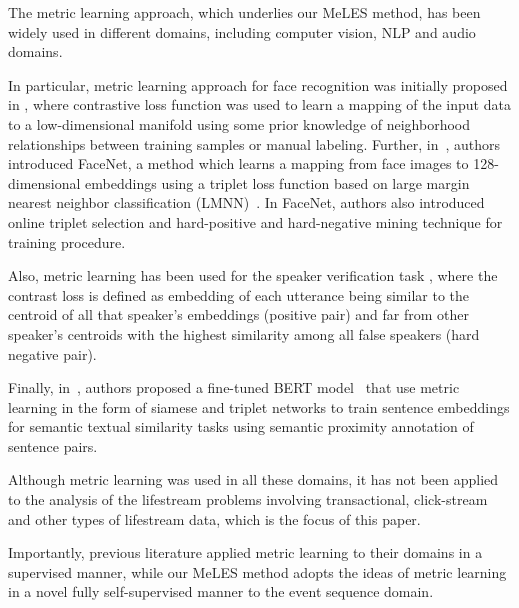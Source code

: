 \documentclass[sigconf, anonymous]{acmart}
\begin{document}

The metric learning approach, which underlies our MeLES method, has been widely used in different domains, including computer vision, NLP and audio domains. 

In particular, metric learning approach for face recognition was initially proposed in \cite{chopra2005learning}, where contrastive loss function was used to learn a mapping of the input data to a low-dimensional manifold using some prior knowledge of neighborhood relationships between training samples or manual labeling. Further, in~\cite{Schroff2015FaceNetAU}, authors introduced FaceNet, a method which learns a mapping from face images to 128-dimensional embeddings using a triplet loss function based on large margin nearest neighbor classification (LMNN)~\cite{weinberger2006distance}. In FaceNet, authors also introduced online triplet selection and hard-positive and hard-negative mining technique for training procedure.


Also, metric learning has been used for the speaker verification task \cite{wan2017generalized}, where the contrast loss is defined as embedding of each utterance being similar to the centroid of all that speaker's embeddings (positive pair) and far from other speaker's centroids with the highest similarity among all false speakers (hard negative pair).

Finally, in~\cite{reimers-2019-sentence-bert}, authors proposed a fine-tuned BERT model~\cite{Devlin2019BERTPO} that use metric learning in the form of siamese and triplet networks to train sentence embeddings for semantic textual similarity tasks using semantic proximity annotation of sentence pairs.

Although metric learning was used in all these domains, it has not been applied to the analysis of the lifestream problems involving transactional, click-stream and other types of lifestream data, which is the focus of this paper.

Importantly, previous literature applied metric learning to their domains in a supervised manner, while our MeLES method adopts the ideas of metric learning in a novel fully self-supervised manner to the event sequence domain.  
\end{document}
